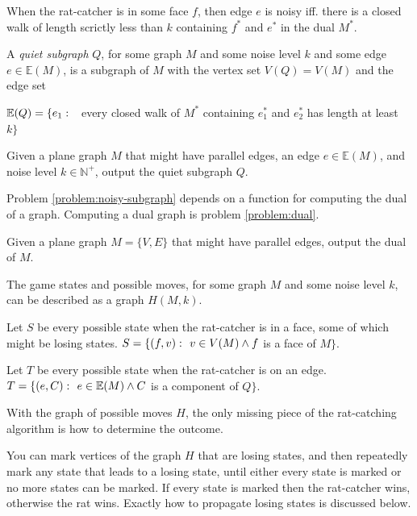 \documentclass{article}
\begin{document}
		\begin{definition}\label{def:face-quiet}
			When the rat-catcher is in some face $f$, then edge $e$ is noisy iff. there is a closed walk of length scrictly less than $k$ containing $f^*$ and $e^*$ in the dual $M^*$.
		\end{definition}

		A \textit{quiet subgraph} $Q$, for some graph $M$ and some noise level $k$ and some edge $e \in \mathbb{E}(M)$, is a subgraph of $M$ with the vertex set $V(Q) = V(M)$ and the edge set

		$\mathbb{E}(Q) = \{e_1 \,\colon\  $ every closed walk of $M^*$ containing $e_1^*$ and $e_2^*$ has length at least $k\}$

		\begin{problem}\label{problem:noisy-subgraph}
			Given a plane graph $M$ that might have parallel edges, an edge $e \in \mathbb{E}(M)$, and noise level $k \in \mathbb{N}^+$, output the quiet subgraph $Q$.
		\end{problem}

		Problem \ref{problem:noisy-subgraph} depends on a function for computing the dual of a graph. Computing a dual graph is problem \ref{problem:dual}.

		\begin{problem}\label{problem:dual}
			Given a plane graph $M = \{V, E\}$ that might have parallel edges, output the dual of $M$.
		\end{problem}

		The game states and possible moves, for some graph $M$ and some noise level $k$, can be described as a graph $H(M, k)$.

		Let $S$ be every possible state when the rat-catcher is in a face, some of which might be losing states. $S = \{ (f, v) \,\colon\  v \in V(M) \land f$ is a face of $ M \}$.

		Let $T$ be every possible state when the rat-catcher is on an edge. $T = \{ (e, C) \,\colon\  e \in \mathbb{E}(M) \land C$ is a component of $Q \}$.
		
		With the graph of possible moves $H$, the only missing piece of the rat-catching algorithm is how to determine the outcome.

		You can mark vertices of the graph $H$ that are losing states, and then repeatedly mark any state that leads to a losing state, until either every state is marked or no more states can be marked. If every state is marked then the rat-catcher wins, otherwise the rat wins. Exactly how to propagate losing states is discussed below.
\end{document}
